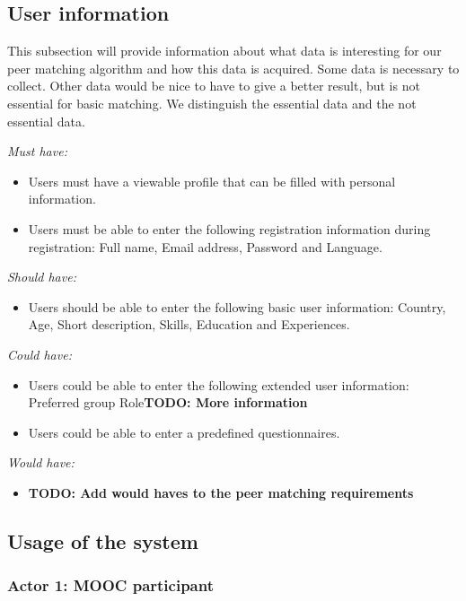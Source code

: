 \documentclass[]{article}
\newcommand{\TODO}[1]{{\color{red}\textbf{TODO: #1}}}
\newcommand{\reqr}[1]{{\noindent\emph{#1:}}}
\begin{document}
\subsection{User information}
This subsection will provide information about what data is interesting for our peer matching algorithm and how this data is acquired.
Some data is necessary to collect. 
Other data would be nice to have to give a better result, but is not essential for basic matching.
We distinguish the essential data and the not essential data.

\reqr{Must have}
\begin{itemize}
\item Users must have a viewable profile that can be filled with personal information.
\item Users must be able to enter the following registration information during registration: Full name, Email address, Password and Language.
\end{itemize}

\reqr{Should have}
\begin{itemize}
\item Users should be able to enter the following basic user information: Country, Age, Short description, Skills, Education and Experiences.
\end{itemize}

\reqr{Could have}
\begin{itemize}
\item Users could be able to enter the following extended user information: Preferred group Role\TODO{More information}
\item Users could be able to enter a predefined questionnaires.
\end{itemize}

\reqr{Would have}
\begin{itemize}
\item \TODO{Add would haves to the peer matching requirements}
\end{itemize}

\subsection{Usage of the system}

\subsubsection{Actor 1: MOOC participant}
\end{document}
